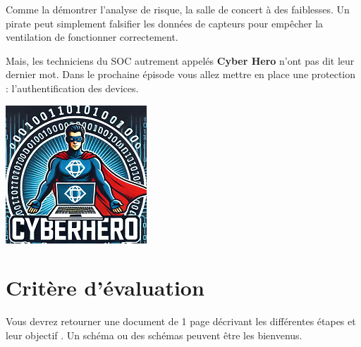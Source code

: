 \documentclass[french, 12pt]{article}%
\newif\ifPROF
\begin{document}
\begin{minipage}{0.55\linewidth}
Comme la démontrer l'analyse de risque, la salle de concert à des faiblesses. Un pirate peut simplement falsifier les données de capteurs pour empêcher la ventilation de fonctionner correctement. 


Mais, les techniciens du SOC autrement appelés \textbf{Cyber Hero} n'ont pas dit leur dernier mot. Dans le prochaine épisode vous allez mettre en place une protection : l'authentification des devices.
\end{minipage}
\begin{minipage}{0.44\linewidth}
\begin{center}
\includegraphics[scale=0.7]{./ressource/cyberHro.png}
\end{center}
\end{minipage}


\ifPROF
\color{red}
Pense bête installation.
\begin{lstlisting}[style=commande]
Admin borne wifi : 
pviland
choupette


SSID : salleCIEL
mdp : rockstar

PC_PV : 192.168.1.19
devicePV : 

lsub modele de la puce

sudo ip link set eth0 promisc on

\end{lstlisting}


Choix des puces : Ralink RT5372 

Les modèles comme le Panda PAU06 ou l’EDUP EP-MS8551
\normalcolor
\fi




\section{Critère d'évaluation}
\label{lblCritere}
Vous devrez retourner une document de 1 page décrivant les différentes étapes et leur objectif . Un schéma ou des schémas peuvent être les bienvenus.
\end{document}

